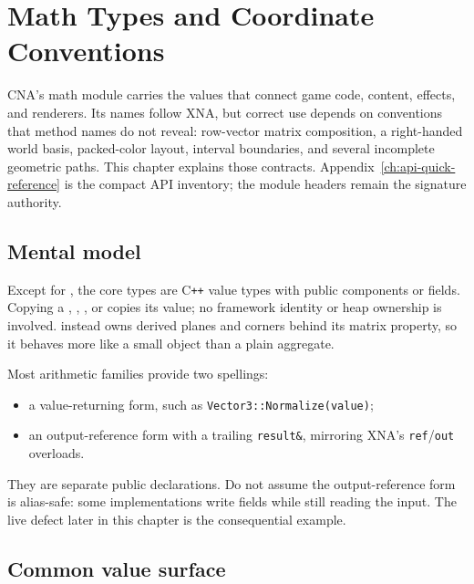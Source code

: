 \chapter{Math Types and Coordinate Conventions}
\label{ch:math-conventions}
\label{ch:math-core-types}

CNA's math module carries the values that connect game code, content, effects, and renderers.
Its names follow XNA, but correct use depends on conventions that method names do not reveal:
row-vector matrix composition, a right-handed world basis, packed-color layout, interval
boundaries, and several incomplete geometric paths. This chapter explains those contracts.
Appendix~\ref{ch:api-quick-reference} is the compact API inventory; the module headers remain the
signature authority.

\section{Mental model}

Except for , the core types are C\texttt{++} value types with public
components or fields. Copying a , , , or
 copies its value; no framework identity or heap ownership is involved.
 instead owns derived planes and corners behind its matrix property, so
it behaves more like a small object than a plain aggregate.

Most arithmetic families provide two spellings:

\begin{itemize}
  \item a value-returning form, such as \texttt{Vector3::Normalize(value)};
  \item an output-reference form with a trailing \texttt{result\&}, mirroring XNA's
        \texttt{ref}/\texttt{out} overloads.
\end{itemize}

They are separate public declarations. Do not assume the output-reference form is alias-safe:
some implementations write fields while still reading the input. The live
 defect later in this chapter is the consequential example.

\section{Common value surface}
\label{sec:shared-debug-surface}

